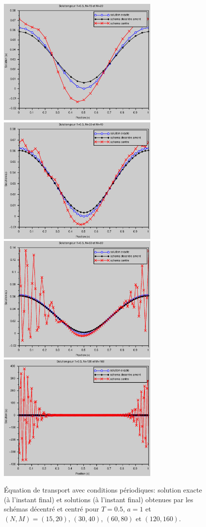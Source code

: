 \documentclass[12pt,a4paper,twoside]{article}
\begin{document}
\begin{figure}[h]
  \centering
  \includegraphics[width = 8cm]{Figures/transport_per_N15.eps}
  \includegraphics[width = 8cm]{Figures/transport_per_N30.eps}
  \includegraphics[width = 8cm]{Figures/transport_per_N60.eps}
  \includegraphics[width = 8cm]{Figures/transport_per_N120.eps}
  \caption{\'Equation de transport avec conditions p\'eriodiques: solution exacte (\`a 
    l'instant final) et
    solutions (\`a l'instant final) 
    obtenues par les sch\'emas d\'ecentr\'e et centr\'e pour $T=0.5$, $a=1$ et
    $(N,M) = (15,20)$, $(30,40)$, $(60,80)$ et $(120,160)$.}
  \label{fig:trans_per}
\end{figure}
\end{document}
